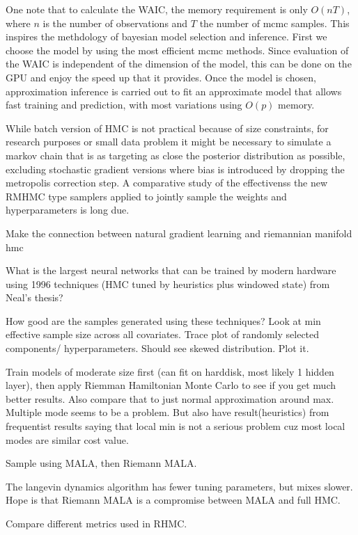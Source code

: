 \documentclass[]{report}
\begin{document}
\begin{enumerate}
One note that to calculate the WAIC, the memory requirement is only $O(nT)$,
where $n$ is the number of observations and $T$ the number of mcmc samples. This
inspires the methdology of bayesian model selection and inference. First we
choose the model by using the most efficient mcmc methods. Since evaluation of
the WAIC is independent of the dimension of the model, this can be done on the
GPU and enjoy the speed up that it provides. Once the model is chosen,
approximation inference is carried out to fit an approximate model that allows
fast training and prediction, with most variations using $O(p)$ memory.

While batch version of HMC is not practical because of size constraints, for
research purposes or small data problem it might be necessary to simulate a
markov chain that is as targeting as close the posterior distribution as
possible, excluding stochastic gradient versions where bias is introduced by
dropping the metropolis correction step. A comparative study of the effectivenss the new
RMHMC type samplers applied to jointly sample the weights and hyperparameters is
long due. 

Make the connection between natural gradient learning and riemannian manifold
hmc



What is the largest neural networks that can be trained by modern hardware using 1996 techniques (HMC tuned by heuristics plus windowed state) from Neal's thesis?  

How good are the samples generated using these techniques? Look at min effective sample size across all covariates. Trace plot of randomly selected components/ hyperparameters. Should see skewed distribution. Plot it.


Train models of moderate size first (can fit on harddisk, most likely 1 hidden layer), then apply Riemman Hamiltonian Monte Carlo to see if you get much better results. Also compare that to just normal approximation around max. Multiple mode seems to be a problem. But also have result(heuristics) from frequentist results saying that local min is not a serious problem cuz most local modes are similar cost value. 

Sample using MALA, then Riemann MALA.

The langevin dynamics algorithm has fewer tuning parameters, but mixes slower. Hope is that Riemann MALA is a compromise between MALA and full HMC. 

Compare different metrics used in RHMC. 


\end{enumerate}
\end{document}

